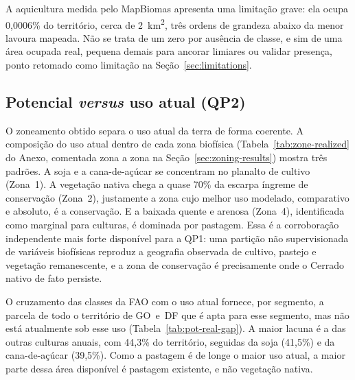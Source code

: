 A aquicultura medida pelo MapBiomas apresenta uma limitação grave: ela ocupa 0,0006\% do território,
cerca de 2~km\textsuperscript{2}, três ordens de grandeza abaixo da menor lavoura mapeada.
Não se trata de um zero por ausência de classe, e sim de uma área ocupada real, pequena demais para
ancorar limiares ou validar presença, ponto retomado como limitação na Seção~\ref{sec:limitations}.

\begin{table}[htbp]
\centering
\caption{Composição do uso atual da terra de GO~e~DF, como parcela do território. As
classes não modeladas agregam usos que o MapBiomas distingue, mas que este estudo não avalia
(urbano, mineração, água, silvicultura, culturas perenes e aquicultura).}
\label{tab:realized-composition}

\end{table}

\subsection{Potencial \emph{versus} uso atual (QP2)}\label{sec:pot-vs-real}

O zoneamento obtido separa o uso atual da terra de forma coerente. A composição do uso atual dentro
de cada zona biofísica (Tabela~\ref{tab:zone-realized} do Anexo, comentada zona a zona na
Seção~\ref{sec:zoning-results}) mostra três padrões. A soja e a cana-de-açúcar se concentram no
planalto de cultivo (Zona~1). A vegetação nativa chega a quase 70\% da escarpa íngreme de conservação
(Zona~2), justamente a zona cujo melhor uso modelado, comparativo e absoluto, é a conservação. E a
baixada quente e arenosa (Zona~4), identificada como marginal para culturas, é dominada por pastagem.
Essa é a corroboração independente mais forte disponível para a QP1: uma partição não supervisionada
de variáveis biofísicas reproduz a geografia observada de cultivo, pastejo e vegetação remanescente, e
a zona de conservação é precisamente onde o Cerrado nativo de fato persiste.

O cruzamento das classes da FAO com o uso atual fornece, por segmento, a parcela de todo o território
de GO~e~DF que é apta para esse segmento, mas não está atualmente sob esse uso
(Tabela~\ref{tab:pot-real-gap}). A maior lacuna é a das outras culturas anuais, com 44,3\% do
território, seguidas da soja (41,5\%) e da cana-de-açúcar (39,5\%). Como a pastagem é de longe o maior
uso atual, a maior parte dessa área disponível é pastagem existente, e não vegetação nativa.

